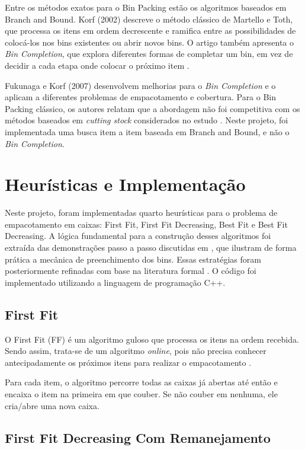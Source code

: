 \documentclass[12pt]{article}
\begin{document}
Entre os métodos exatos para o Bin Packing estão os algoritmos baseados em Branch and Bound. Korf (2002) descreve o método clássico de Martello e Toth, que processa os itens em ordem decrescente e ramifica entre as possibilidades de colocá-los nos bins existentes ou abrir novos bins. O artigo também apresenta o \textit{Bin Completion}, que explora diferentes formas de completar um bin, em vez de decidir a cada etapa onde colocar o próximo item \cite{korf2002}.

Fukunaga e Korf (2007) desenvolvem melhorias para o \textit{Bin Completion} e o aplicam a diferentes problemas de empacotamento e cobertura. Para o Bin Packing clássico, os autores relatam que a abordagem não foi competitiva com os métodos baseados em \textit{cutting stock} considerados no estudo \cite{fukunaga2007}. Neste projeto, foi implementada uma busca item a item baseada em Branch and Bound, e não o \textit{Bin Completion}.

\section{Heurísticas e Implementação}

Neste projeto, foram implementadas quarto heurísticas para o problema de empacotamento em caixas: First Fit, First Fit Decreasing, Best Fit e  Best Fit Decreasing. A lógica fundamental para a construção desses algoritmos foi extraída das demonstrações passo a passo discutidas em \cite{video_youtube}, que ilustram de forma prática a mecânica de preenchimento dos bins. Essas estratégias foram posteriormente refinadas com base na literatura formal \cite{ambrose2025, friesen1986}. O código foi implementado utilizando a linguagem de programação C++.

\subsection{First Fit}

O First Fit (FF) é um algoritmo guloso que processa os itens na ordem recebida. Sendo assim, trata-se de um algoritmo \textit{online}, pois não precisa conhecer antecipadamente os próximos itens para realizar o empacotamento \cite{ambrose2025}. 

Para cada item, o algoritmo percorre todas as caixas já abertas até então e encaixa o item na primeira em que couber. Se não couber em nenhuma, ele cria/abre uma nova caixa. 

\subsection{First Fit Decreasing Com Remanejamento}
\end{document}
